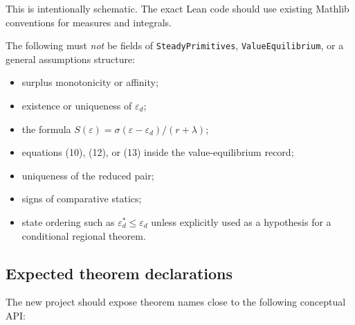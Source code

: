 \documentclass[11pt]{article}
\newcommand{\epsd}{\varepsilon_d}
\begin{document}
This is intentionally schematic. The exact Lean code should use existing Mathlib conventions for measures and integrals.

The following must \emph{not} be fields of \texttt{SteadyPrimitives}, \texttt{ValueEquilibrium}, or a general assumptions structure:
\begin{itemize}
\item surplus monotonicity or affinity;
\item existence or uniqueness of $\epsd$;
\item the formula $S(\varepsilon)=\sigma(\varepsilon-\epsd)/(r+\lambda)$;
\item equations (10), (12), or (13) inside the value-equilibrium record;
\item uniqueness of the reduced pair;
\item signs of comparative statics;
\item state ordering such as $\epsd^*\le\epsd$ unless explicitly used as a hypothesis for a conditional regional theorem.
\end{itemize}

\subsection{Expected theorem declarations}

The new project should expose theorem names close to the following conceptual API:
\end{document}
